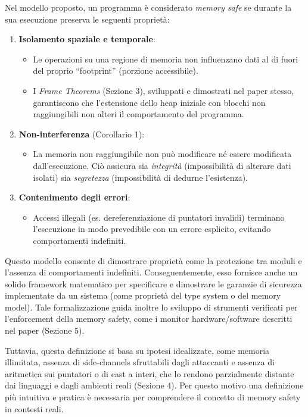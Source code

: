 Nel modello proposto, un programma è considerato \textit{memory safe} se durante
la sua esecuzione preserva le seguenti proprietà:
\begin{enumerate}
  \item \textbf{Isolamento spaziale e temporale}:
    \begin{itemize}
      \item Le operazioni su una regione di memoria non influenzano dati al di fuori
        del proprio ``footprint'' (porzione accessibile).

      \item I \textit{Frame Theorems} (Sezione 3), sviluppati e dimostrati nel paper
        stesso, garantiscono che l'estensione dello heap iniziale con blocchi
        non raggiungibili non alteri il comportamento del programma.
    \end{itemize}

  \item \textbf{Non-interferenza} (Corollario 1):
    \begin{itemize}
      \item La memoria non raggiungibile non può modificare né essere modificata
        dall'esecuzione. Ciò assicura sia \textit{integrità} (impossibilità di
        alterare dati isolati) sia \textit{segretezza} (impossibilità di dedurne
        l'esistenza).
    \end{itemize}

  \item \textbf{Contenimento degli errori}:
    \begin{itemize}
      \item Accessi illegali (es. dereferenziazione di puntatori invalidi)
        terminano l'esecuzione in modo prevedibile con un errore esplicito, evitando
        comportamenti indefiniti.
    \end{itemize}
\end{enumerate}

Questo modello consente di dimostrare proprietà come la protezione tra moduli e
l'assenza di comportamenti indefiniti. Conseguentemente, esso fornisce anche un
solido framework matematico per specificare e dimostrare le garanzie di
sicurezza implementate da un sistema (come proprietà del type system o del memory
model). Tale formalizzazione guida inoltre lo sviluppo di strumenti verificati per
l'enforcement della memory safety, come i monitor hardware/software descritti
nel paper (Sezione 5).

Tuttavia, questa definizione si basa su ipotesi idealizzate, come memoria
illimitata, assenza di side-channels sfruttabili dagli attaccanti e assenza di aritmetica
sui puntatori o di cast a interi, che lo rendono parzialmente distante dai
linguaggi e dagli ambienti reali (Sezione 4). Per questo motivo una definizione più
intuitiva e pratica è necessaria per comprendere il concetto di memory safety in
contesti reali.

